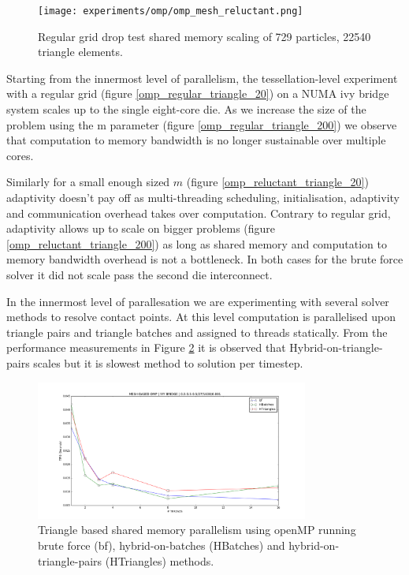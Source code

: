 \begin{figure}[htb]
  \begin{center}
    \texttt{[image: experiments/omp/omp\_mesh\_reluctant.png]}
  \end{center}
  \caption{Regular grid drop test shared memory scaling of 729 particles, 22540 triangle elements.}
  \label{figure:omp_reluctant_triangle_20}
\end{figure}


Starting from the innermost level of parallelism, the tessellation-level experiment with a regular grid (figure \ref{omp_regular_triangle_20}) on a NUMA ivy bridge system scales up to the single eight-core die. As we increase the size of the problem using the m parameter (figure \ref{omp_regular_triangle_200}) we observe that computation to memory bandwidth is no longer sustainable over multiple cores. 

Similarly for a small enough sized $m$ (figure \ref{omp_reluctant_triangle_20}) adaptivity doesn't pay off as multi-threading scheduling, initialisation, adaptivity and communication overhead takes over computation. Contrary to regular grid, adaptivity allows up to scale on bigger problems (figure \ref{omp_reluctant_triangle_200}) as long as shared memory and computation to memory bandwidth overhead is not a bottleneck. In both cases for the brute force solver it did not scale pass the second die interconnect.



In the innermost level of parallesation we are experimenting with several solver methods to resolve contact points. At this level computation is parallelised upon triangle pairs and triangle batches and assigned to threads statically. 
From the performance measurements in Figure \ref{figure:triangle_omp} it is observed that Hybrid-on-triangle-pairs scales but it is slowest method to solution per timestep. 

\begin{figure}[htb]
  \begin{center}
    \includegraphics[width=0.8\textwidth]{experiments/random/omp/triangle_based_x0.png}
  \end{center}
  \caption{Triangle based shared memory parallelism using openMP running brute force (bf), hybrid-on-batches (HBatches) and hybrid-on-triangle-pairs (HTriangles) methods.}
  \label{figure:triangle_omp}
\end{figure}

